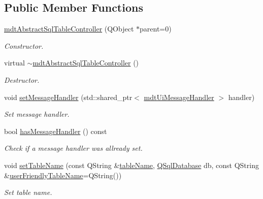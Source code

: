 \subsection*{Public Member Functions}
\begin{DoxyCompactItemize}
\item 
\hyperlink{classmdt_abstract_sql_table_controller_aa0a7c138fe64931faad0f94bcb34f9a8}{mdt\-Abstract\-Sql\-Table\-Controller} (Q\-Object $\ast$parent=0)
\begin{DoxyCompactList}\small\item\em Constructor. \end{DoxyCompactList}\item 
virtual \hyperlink{classmdt_abstract_sql_table_controller_a5fc7cf40c3dde3b5bbabca5a28c2c221}{$\sim$mdt\-Abstract\-Sql\-Table\-Controller} ()
\begin{DoxyCompactList}\small\item\em Destructor. \end{DoxyCompactList}\item 
void \hyperlink{classmdt_abstract_sql_table_controller_ab3939b6f1d191283709efdf0f64c524a}{set\-Message\-Handler} (std\-::shared\-\_\-ptr$<$ \hyperlink{classmdt_ui_message_handler}{mdt\-Ui\-Message\-Handler} $>$ handler)
\begin{DoxyCompactList}\small\item\em Set message handler. \end{DoxyCompactList}\item 
bool \hyperlink{classmdt_abstract_sql_table_controller_ab0a83cfc65c3b6569396f60a25cf7323}{has\-Message\-Handler} () const 
\begin{DoxyCompactList}\small\item\em Check if a message handler was allready set. \end{DoxyCompactList}\item 
void \hyperlink{classmdt_abstract_sql_table_controller_a5a94417dc46a7dc6de8b5ba0593494a7}{set\-Table\-Name} (const Q\-String \&\hyperlink{classmdt_abstract_sql_table_controller_aaf864d069aeb74068b6daa747b740944}{table\-Name}, \hyperlink{class_q_sql_database}{Q\-Sql\-Database} db, const Q\-String \&\hyperlink{classmdt_abstract_sql_table_controller_a1a9b3d3e4009acd32fc4a083f738fc62}{user\-Friendly\-Table\-Name}=Q\-String())
\begin{DoxyCompactList}\small\item\em Set table name. \end{DoxyCompactList}\item 

\end{DoxyCompactItemize}

